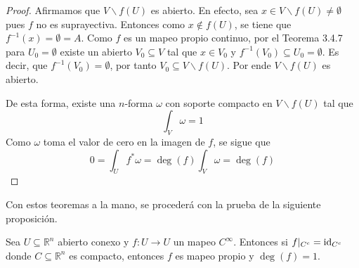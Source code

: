 \documentclass[12pt]{report}
\theoremstyle{largebreak}
\newcommand\cf[3]{\ensuremath{#1:#2\rightarrow#3}}
\begin{document}
\begin{proof}
    Afirmamos que $V\backslash f(U)$ es abierto. En efecto, sea $x\in V\backslash f(U)\neq \emptyset$ pues $f$ no es suprayectiva. Entonces como $x\notin f(U)$, se tiene que $f^{-1}(x)=\emptyset=A$. Como $f$ es un mapeo propio continuo, por el Teorema 3.4.7 para $U_0=\emptyset$ existe un abierto $V_0\subseteq V$ tal que $x\in V_0$ y $f^{-1}(V_0)\subseteq U_0=\emptyset$. Es decir, que $f^{-1}(V_0)=\emptyset$, por tanto $V_0\subseteq V\backslash f(U)$. Por ende $V\backslash f(U)$ es abierto.

    De esta forma, existe una $n$-forma $\omega$ con soporte compacto en $V\backslash f(U)$ tal que
    \begin{equation*}
        \int_{V}\omega = 1
    \end{equation*}
    Como $\omega$ toma el valor de cero en la imagen de $f$, se sigue que
    \begin{equation*}
        0=\int_{U}f^*\omega=\deg(f)\int_{V}\omega = \deg(f)
    \end{equation*}
\end{proof}

Con estos teoremas a la mano, se procederá con la prueba de la siguiente proposición.

\begin{propo}
    Sea $U\subseteq \mathbb{R}^n$ abierto conexo y $\cf{f}{U}{U}$ un mapeo $C^{\infty}$. Entonces si $f|_{C^c}=\textup{id}_{C^c}$ donde $C\subseteq\mathbb{R}^n$ es compacto, entonces $f$ es mapeo propio y $\deg(f)=1$.
\end{propo}
\end{document}
